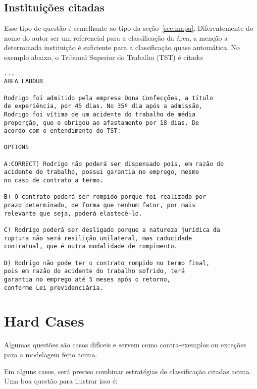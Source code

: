 \documentclass{article}
\begin{document}
\subsection{Instituições citadas}

Esse tipo de questão é semelhante ao tipo da
seção~\ref{sec:mapa}. Diferentemente do nome do autor ser um
referencial para a classificação da área, a menção a determinada
instituição é suficiente para a classificação quase automática. No
exemplo abaixo, o Tribunal Superior do Trabalho (TST) é citado:

\begin{verbatim}
...
AREA LABOUR
 
Rodrigo foi admitido pela empresa Dona Confecções, a título 
de experiência, por 45 dias. No 35º dia após a admissão, 
Rodrigo foi vítima de um acidente do trabalho de média 
proporção, que o obrigou ao afastamento por 18 dias. De 
acordo com o entendimento do TST: 
 
OPTIONS

A:CORRECT) Rodrigo não poderá ser dispensado pois, em razão do 
acidente do trabalho, possui garantia no emprego, mesmo 
no caso de contrato a termo.  

B) O contrato poderá ser rompido porque foi realizado por 
prazo determinado, de forma que nenhum fator, por mais 
relevante que seja, poderá elastecê-lo. 

C) Rodrigo poderá ser desligado porque a natureza jurídica da 
ruptura não será resilição unilateral, mas caducidade 
contratual, que é outra modalidade de rompimento. 

D) Rodrigo não pode ter o contrato rompido no termo final, 
pois em razão do acidente do trabalho sofrido, terá 
garantia no emprego até 5 meses após o retorno, 
conforme Lei previdenciária. 
\end{verbatim}

\section{Hard Cases}

Algumas questões são casos difíceis e servem como contra-exemplos ou
exceções para a modelagem feito acima.

Em alguns casos, será preciso combinar estratégias de classificação
citadas acima. Uma boa questão para ilustrar isso é:
\end{document}
